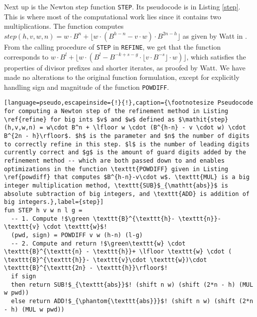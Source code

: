 Next up is the Newton step function \texttt{STEP}. Its pseudocode is in Listing
\ref{step}. This is where most of the computational work lies since it contains
two multiplications. The function computes
$\mathit{step}(h,v,w,n) = w\cdot B^n + \lfloor w \cdot (B^{h-n} - v \cdot w) \cdot B^{2n - h}\rfloor$ as
given by Watt in \cite{watt2023efficient}. From the calling procedure of
\texttt{STEP} in \texttt{REFINE}, we get that the function corresponds to
$w\cdot B^l + \lfloor w \cdot (B^{l} - B^{-k+s-g} \cdot \lfloor v\cdot B^{-s} \rfloor \cdot w)\rfloor$, which satisfies the
properties of divisor prefixes and shorter iterates, as proofed by Watt. We have made
no alterations to the original function formulation, except for explicitly
handling sign and magnitude of the function \texttt{POWDIFF}.

\begin{lstlisting}[language=pseudo,escapeinside={!}{!},caption={\footnotesize Pseudocode for computing a Newton step of the refinement method in Listing \ref{refine} for big ints $v$ and $w$ defined as $\mathit{step}(h,v,w,n) = w\cdot B^n + \lfloor w \cdot (B^{h-n} - v \cdot w) \cdot B^{2n - h}\rfloor$. $h$ is the parameter and $n$ the number of digits to correctly refine in this step. $l$ is the number of leading digits currently correct and $g$ is the amount of guard digits added by the refinement method -- which are both passed down to and enables optimizations in the function \texttt{POWDIFF} given in Listing \ref{powdiff} that computes $B^{h-n}-v\cdot w$. \texttt{MUL} is a big integer multiplication method, \texttt{SUB}$_{\mathtt{abs}}$ is absolute subtraction of big integers, and \texttt{ADD} is addition of big integers.},label={step}]
fun STEP h v w n l g =
  -- 1. Compute !$\green \texttt{B}^{\texttt{h}- \texttt{n}}- \texttt{v} \cdot \texttt{w}$!
  (pwd, sign) = POWDIFF v w (h-n) (l-g)
  -- 2. Compute and return !$\green\texttt{w} \cdot \texttt{B}^{\texttt{n} - \texttt{h}}+ \lfloor \texttt{w} \cdot ( \texttt{B}^{\texttt{h}}- \texttt{v}\cdot \texttt{w})\cdot \texttt{B}^{\texttt{2n} - \texttt{h}}\rfloor$!
  if sign
  then return SUB!$_{\texttt{abs}}$! (shift n w) (shift (2*n - h) (MUL w pwd))
  else return ADD!$_{\phantom{\texttt{abs}}}$! (shift n w) (shift (2*n - h) (MUL w pwd))
\end{lstlisting}

